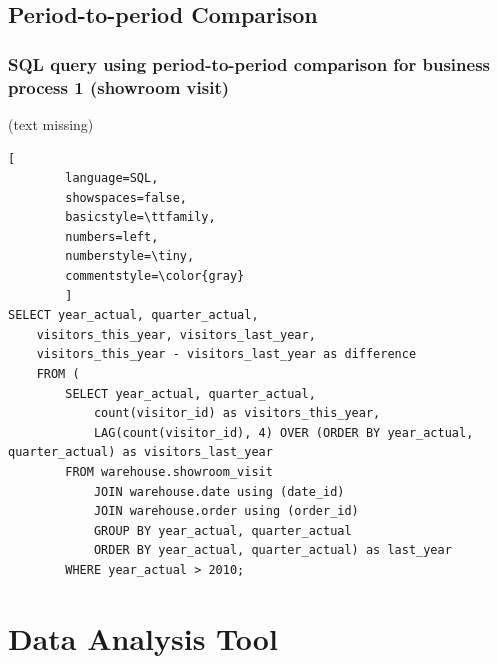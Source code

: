 \documentclass[letterpaper,12pt]{article}
\begin{document}
\subsection{Period-to-period Comparison}

\subsubsection{SQL query using period-to-period comparison for business process 1 (showroom visit)}

(text missing)

\begin{lstlisting}[
        language=SQL,
        showspaces=false,
        basicstyle=\ttfamily,
        numbers=left,
        numberstyle=\tiny,
        commentstyle=\color{gray}
        ]
SELECT year_actual, quarter_actual, 
	visitors_this_year, visitors_last_year,
	visitors_this_year - visitors_last_year as difference
	FROM (
		SELECT year_actual, quarter_actual,
			count(visitor_id) as visitors_this_year,
			LAG(count(visitor_id), 4) OVER (ORDER BY year_actual, quarter_actual) as visitors_last_year 
		FROM warehouse.showroom_visit
			JOIN warehouse.date using (date_id)
			JOIN warehouse.order using (order_id)
			GROUP BY year_actual, quarter_actual
			ORDER BY year_actual, quarter_actual) as last_year
		WHERE year_actual > 2010;
\end{lstlisting}

\section{Data Analysis Tool}


% 
\end{document}
